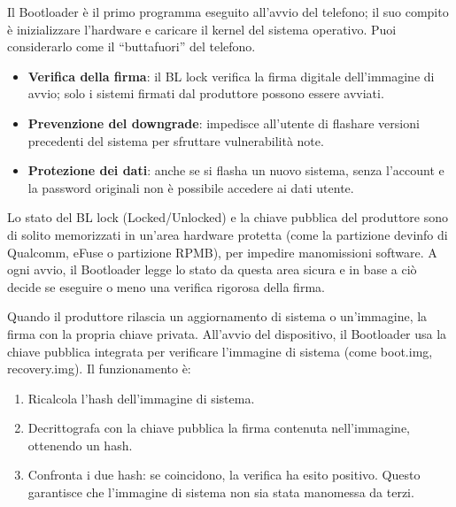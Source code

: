 


Il Bootloader è il primo programma eseguito all'avvio del telefono; il suo compito è inizializzare l'hardware e caricare il kernel del sistema operativo. Puoi considerarlo come il “buttafuori” del telefono.


\begin{itemize}
  \item \textbf{Verifica della firma}: il BL lock verifica la firma digitale dell'immagine di avvio; solo i sistemi firmati dal produttore possono essere avviati.
  \item \textbf{Prevenzione del downgrade}: impedisce all'utente di flashare versioni precedenti del sistema per sfruttare vulnerabilità note.
  \item \textbf{Protezione dei dati}: anche se si flasha un nuovo sistema, senza l'account e la password originali non è possibile accedere ai dati utente.
\end{itemize}


Lo stato del BL lock (Locked/Unlocked) e la chiave pubblica del produttore sono di solito memorizzati in un'area hardware protetta (come la partizione devinfo di Qualcomm, eFuse o partizione RPMB), per impedire manomissioni software. A ogni avvio, il Bootloader legge lo stato da questa area sicura e in base a ciò decide se eseguire o meno una verifica rigorosa della firma.


Quando il produttore rilascia un aggiornamento di sistema o un'immagine, la firma con la propria chiave privata. All'avvio del dispositivo, il Bootloader usa la chiave pubblica integrata per verificare l'immagine di sistema (come boot.img, recovery.img). Il funzionamento è:

\begin{enumerate}
  \item Ricalcola l'hash dell'immagine di sistema.
  \item Decrittografa con la chiave pubblica la firma contenuta nell'immagine, ottenendo un hash.
  \item Confronta i due hash: se coincidono, la verifica ha esito positivo. Questo garantisce che l'immagine di sistema non sia stata manomessa da terzi.
\end{enumerate}

